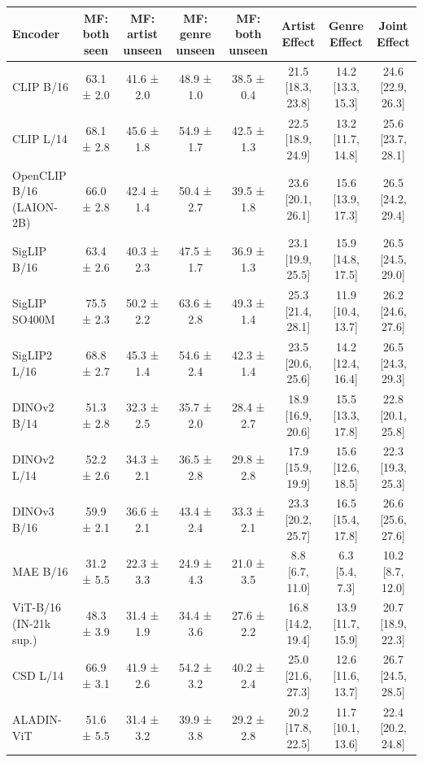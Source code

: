 \begin{tabular}{lccccccc}
\toprule
Encoder & MF: both seen & MF: artist unseen & MF: genre unseen & MF: both unseen & Artist Effect & Genre Effect & Joint Effect \\
\midrule
CLIP B/16 & 63.1 ± 2.0 & 41.6 ± 2.0 & 48.9 ± 1.0 & 38.5 ± 0.4 & 21.5 [18.3, 23.8] & 14.2 [13.3, 15.3] & 24.6 [22.9, 26.3] \\
CLIP L/14 & 68.1 ± 2.8 & 45.6 ± 1.8 & 54.9 ± 1.7 & 42.5 ± 1.3 & 22.5 [18.9, 24.9] & 13.2 [11.7, 14.8] & 25.6 [23.7, 28.1] \\
OpenCLIP B/16 (LAION-2B) & 66.0 ± 2.8 & 42.4 ± 1.4 & 50.4 ± 2.7 & 39.5 ± 1.8 & 23.6 [20.1, 26.1] & 15.6 [13.9, 17.3] & 26.5 [24.2, 29.4] \\
SigLIP B/16 & 63.4 ± 2.6 & 40.3 ± 2.3 & 47.5 ± 1.7 & 36.9 ± 1.3 & 23.1 [19.9, 25.5] & 15.9 [14.8, 17.5] & 26.5 [24.5, 29.0] \\
SigLIP SO400M & 75.5 ± 2.3 & 50.2 ± 2.2 & 63.6 ± 2.8 & 49.3 ± 1.4 & 25.3 [21.4, 28.1] & 11.9 [10.4, 13.7] & 26.2 [24.6, 27.6] \\
SigLIP2 L/16 & 68.8 ± 2.7 & 45.3 ± 1.4 & 54.6 ± 2.4 & 42.3 ± 1.4 & 23.5 [20.6, 25.6] & 14.2 [12.4, 16.4] & 26.5 [24.3, 29.3] \\
DINOv2 B/14 & 51.3 ± 2.8 & 32.3 ± 2.5 & 35.7 ± 2.0 & 28.4 ± 2.7 & 18.9 [16.9, 20.6] & 15.5 [13.3, 17.8] & 22.8 [20.1, 25.8] \\
DINOv2 L/14 & 52.2 ± 2.6 & 34.3 ± 2.1 & 36.5 ± 2.8 & 29.8 ± 2.8 & 17.9 [15.9, 19.9] & 15.6 [12.6, 18.5] & 22.3 [19.3, 25.3] \\
DINOv3 B/16 & 59.9 ± 2.1 & 36.6 ± 2.1 & 43.4 ± 2.4 & 33.3 ± 2.1 & 23.3 [20.2, 25.7] & 16.5 [15.4, 17.8] & 26.6 [25.6, 27.6] \\
MAE B/16 & 31.2 ± 5.5 & 22.3 ± 3.3 & 24.9 ± 4.3 & 21.0 ± 3.5 & 8.8 [6.7, 11.0] & 6.3 [5.4, 7.3] & 10.2 [8.7, 12.0] \\
ViT-B/16 (IN-21k sup.) & 48.3 ± 3.9 & 31.4 ± 1.9 & 34.4 ± 3.6 & 27.6 ± 2.2 & 16.8 [14.2, 19.4] & 13.9 [11.7, 15.9] & 20.7 [18.9, 22.3] \\
CSD L/14 & 66.9 ± 3.1 & 41.9 ± 2.6 & 54.2 ± 3.2 & 40.2 ± 2.4 & 25.0 [21.6, 27.3] & 12.6 [11.6, 13.7] & 26.7 [24.5, 28.5] \\
ALADIN-ViT & 51.6 ± 5.5 & 31.4 ± 3.2 & 39.9 ± 3.8 & 29.2 ± 2.8 & 20.2 [17.8, 22.5] & 11.7 [10.1, 13.6] & 22.4 [20.2, 24.8] \\
\bottomrule
\end{tabular}
